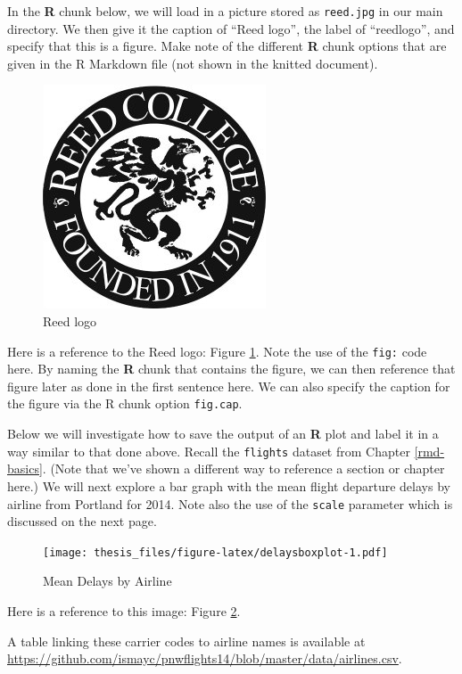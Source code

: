 \documentclass[12pt,twoside]{reedthesis}
\theoremstyle{definition}
\theoremstyle{definition}
\theoremstyle{definition}
\theoremstyle{remark}
\begin{document}
In the \textbf{R} chunk below, we will load in a picture stored as
\texttt{reed.jpg} in our main directory. We then give it the caption of
``Reed logo'', the label of ``reedlogo'', and specify that this is a
figure. Make note of the different \textbf{R} chunk options that are
given in the R Markdown file (not shown in the knitted document).
\begin{figure}
\centering
\includegraphics{figure/reed.jpg}
\caption{\label{fig:reedlogo}Reed logo}
\end{figure}
Here is a reference to the Reed logo: Figure \ref{fig:reedlogo}. Note
the use of the \texttt{fig:} code here. By naming the \textbf{R} chunk
that contains the figure, we can then reference that figure later as
done in the first sentence here. We can also specify the caption for the
figure via the R chunk option \texttt{fig.cap}.

\clearpage

Below we will investigate how to save the output of an \textbf{R} plot
and label it in a way similar to that done above. Recall the
\texttt{flights} dataset from Chapter \ref{rmd-basics}. (Note that we've
shown a different way to reference a section or chapter here.) We will
next explore a bar graph with the mean flight departure delays by
airline from Portland for 2014. Note also the use of the \texttt{scale}
parameter which is discussed on the next page.
\begin{figure}
\centering
\texttt{[image: thesis\_files/figure-latex/delaysboxplot-1.pdf]}
\caption{\label{fig:delaysboxplot}Mean Delays by Airline}
\end{figure}
Here is a reference to this image: Figure \ref{fig:delaysboxplot}.

A table linking these carrier codes to airline names is available at
\url{https://github.com/ismayc/pnwflights14/blob/master/data/airlines.csv}.
\end{document}
